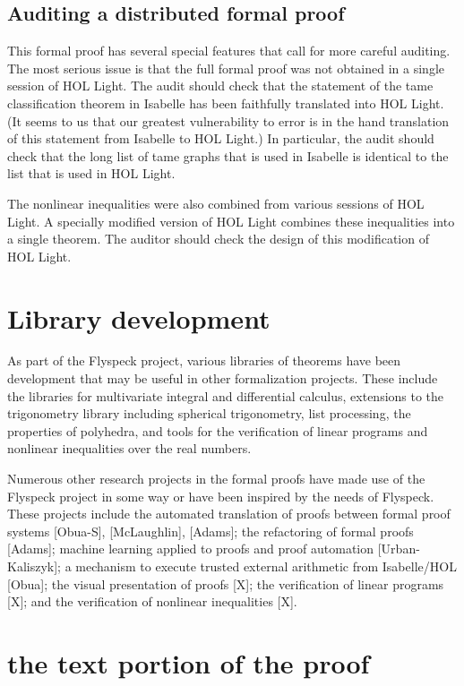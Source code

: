 \subsection{Auditing a distributed formal proof}

This formal proof has several special features that call for more careful auditing.
The most serious issue is that the full formal proof was not obtained in a single session of HOL Light.
The audit should check that the statement of the tame classification theorem in Isabelle has been faithfully translated
into HOL Light.  (It seems to us that our greatest vulnerability to error is in the hand translation of this statement from
Isabelle to HOL Light.)  In particular, the audit should check that the long list of tame graphs that is used in Isabelle is
identical to the list that is used in HOL Light.

The nonlinear inequalities were also combined from various sessions of HOL Light.  A specially modified version of 
HOL Light combines
these inequalities into a single theorem.  The auditor should check the design of this modification of HOL Light.




\section{Library development} 

As part of the Flyspeck project, various libraries of theorems have been development that may be useful in other formalization
projects.  These include the libraries for multivariate integral and differential calculus, extensions to the trigonometry
library including spherical trigonometry, list processing,
the properties of polyhedra,  and tools for the verification of linear programs and nonlinear
inequalities over the real numbers.

Numerous other research projects in the formal proofs have made use of the Flyspeck project in some way or have been inspired by
the needs of Flyspeck.  These projects include the automated translation of proofs between formal proof systems
[Obua-S], [McLaughlin], [Adams]; the refactoring of formal proofs [Adams]; machine learning applied to proofs and
proof automation [Urban-Kaliszyk]; a mechanism to execute trusted external arithmetic 
from Isabelle/HOL [Obua]; the visual presentation of proofs [X]; the verification of linear programs [X]; and the
verification of nonlinear inequalities [X].

\section{the text portion of the proof}

